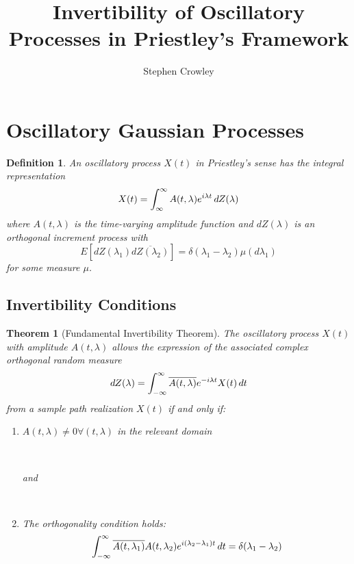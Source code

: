 \documentclass{article}
\newtheorem{definition}{Definition}
\newtheorem{theorem}{Theorem}
\begin{document}
\title{Invertibility of Oscillatory Processes in Priestley's Framework}

\author{Stephen Crowley}

\date{}

\maketitle

{\tableofcontents}

\section{Oscillatory Gaussian Processes}

\begin{definition}
  An oscillatory process $X (t)$ in Priestley's sense has the integral
  representation
  \begin{equation}
    X (t) = \int_{\infty}^{\infty} A (t, \lambda) e^{i \lambda t} 
    \hspace{0.17em} dZ (\lambda)
  \end{equation}
  where $A (t, \lambda)$ is the time-varying amplitude function and $dZ
  (\lambda)$ is an orthogonal increment process with
  \begin{equation}
    E [dZ (\lambda_1) \overline{dZ (\lambda_2)}] = \delta (\lambda_1 -
    \lambda_2) \mu (d \lambda_1)
  \end{equation}
  for some measure $\mu$.
\end{definition}

\subsection{Invertibility Conditions}

\begin{theorem}
  [Fundamental Invertibility Theorem] The oscillatory process $X (t)$ with
  amplitude $A (t, \lambda)$ allows the expression of the associated complex
  orthogonal random measure
  \begin{equation}
    dZ (\lambda) = \int_{- \infty}^{\infty} \overline{A (t, \lambda)} e^{- i
    \lambda t} X (t)  \hspace{0.17em} dt
  \end{equation}
  from a sample path realization $X (t)$ if and only if:
  \begin{enumerate}
    \item $A (t, \lambda) \neq 0 \forall (t, \lambda)$ in the relevant domain
    
    \
    
    and
    
    \
    
    \item The orthogonality condition holds:
    \begin{equation}
      \int_{- \infty}^{\infty} \overline{A (t, \lambda_1)} A (t, \lambda_2)
      e^{i (\lambda_2 - \lambda_1) t}  \hspace{0.17em} dt = \delta (\lambda_1
      - \lambda_2) \label{ortho}
    \end{equation}
  \end{enumerate}
\end{theorem}
\end{document}
